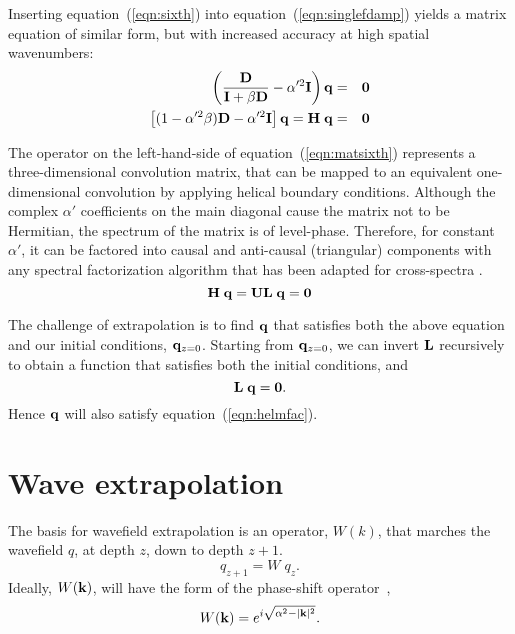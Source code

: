 \par
Inserting equation~(\ref{eqn:sixth}) into
equation~(\ref{eqn:singlefdamp}) yields a matrix equation of
similar form, but with increased accuracy at high spatial wavenumbers: 
\begin{eqnarray} 
\left( \frac{\bf D}{{\bf I} + \beta {\bf D}} - \alpha'^2 {\bf I}
\right) {\bf q} & = & {\bf 0} \\ 
\left[ ( 1 - \alpha'^2 \beta ) {\bf D} -
\alpha'^2 {\bf I} \right] {\bf q}  =  {\bf H} \; {\bf q} & = & {\bf 0}
\label{eqn:matsixth}
\end{eqnarray}

\par
The operator on the left-hand-side of equation~(\ref{eqn:matsixth})
represents a three-dimensional convolution matrix, that can be mapped
to an equivalent one-dimensional convolution by applying helical
boundary conditions.
Although the complex $\alpha'$ coefficients on the main diagonal cause
the matrix not to be Hermitian, the spectrum of the matrix 
is of level-phase. Therefore, for constant $\alpha'$, it can be
factored into causal and anti-causal (triangular) components with any
spectral factorization algorithm that has been adapted for
cross-spectra \cite{Claerbout.sep.97.jon1}. 
\begin{equation} \label{eqn:helmfac}
{\bf H} \; {\bf q} = {\bf U L} \; {\bf q} =  {\bf 0}
\end{equation}

\par
The challenge of extrapolation is to find ${\bf q}$ that
satisfies both the above equation and our initial conditions,
${\bf q}_{z=0}$. Starting from ${\bf q}_{z=0}$, we can invert ${\bf
L}$ recursively to obtain a function that satisfies both the
initial conditions, and 
\begin{equation}
{\bf L} \; {\bf q} =  {\bf 0}.
\end{equation}
Hence ${\bf q}$ will also satisfy equation~(\ref{eqn:helmfac}).

\section{Wave extrapolation}
The basis for wavefield extrapolation is an operator, $W(k)$, that
marches the wavefield $q$, at depth $z$, down to depth $z+1$.
\begin{equation} \label{eqn:extrap}
q_{z+1}=W \; q_{z}.
\end{equation}
Ideally, $W({\bf k})$, will have the form of the phase-shift
operator~\cite{gazdag78},
\begin{equation} \label{eqn:gazdag}
W({\bf k})=e^{i \sqrt{\alpha^2-|{\bf k}|^2}}.
\end{equation}

